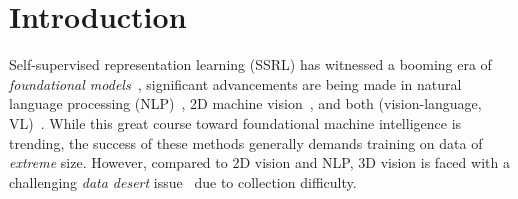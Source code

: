 \documentclass{article}
\theoremstyle{plain}
\theoremstyle{definition}
\theoremstyle{remark}
\begin{document}
\section{Introduction}\label{sec:intro}
\vspace{-2pt}
Self-supervised representation learning (SSRL) has witnessed a booming era of \textit{foundational models}~\citep{FoundationModel21}, significant advancements are being made in natural language processing (NLP)~\citep{GPTv1_18,BERT,GPT3_20,CoT22,InstructGPT22}, 2D machine vision~\citep{MoCo,MAE}, and both (vision-language, VL)~\citep{CLIP,StableDiffusion22,Flamingo22}.
While this great course toward foundational machine intelligence is trending, the success of these methods generally demands training on data of \textit{extreme} size.
However, compared to 2D vision and NLP, 3D vision is faced with a challenging \textit{data desert} issue~\citep{ACT23}
due to collection difficulty.
\end{document}
